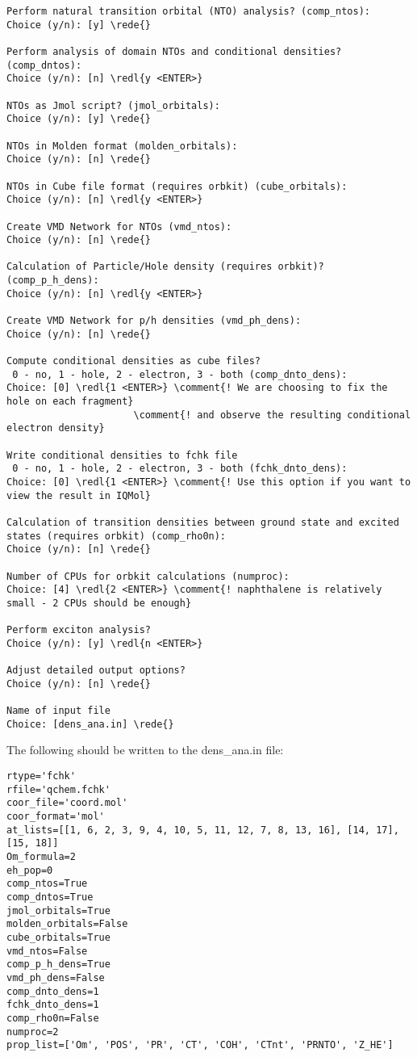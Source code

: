 \documentclass[DIV=12,headings=normal]{scrartcl}
\newcommand{\comment}[1]{\textcolor{blue}{#1}}
\newcommand{\redl}[1]{{\textcolor{red}{\underline{#1}}}}
\newcommand{\rede}[1]{\redl{#1 <ENTER>}}
\begin{document}
\begin{Verbatim}[commandchars=\\\{\}]
Perform natural transition orbital (NTO) analysis? (comp_ntos):
Choice (y/n): [y] \rede{}

Perform analysis of domain NTOs and conditional densities? (comp_dntos):
Choice (y/n): [n] \redl{y <ENTER>}

NTOs as Jmol script? (jmol_orbitals):
Choice (y/n): [y] \rede{}

NTOs in Molden format (molden_orbitals):
Choice (y/n): [n] \rede{}

NTOs in Cube file format (requires orbkit) (cube_orbitals):
Choice (y/n): [n] \redl{y <ENTER>}

Create VMD Network for NTOs (vmd_ntos):
Choice (y/n): [n] \rede{}

Calculation of Particle/Hole density (requires orbkit)? (comp_p_h_dens):
Choice (y/n): [n] \redl{y <ENTER>}

Create VMD Network for p/h densities (vmd_ph_dens):
Choice (y/n): [n] \rede{}

Compute conditional densities as cube files?
 0 - no, 1 - hole, 2 - electron, 3 - both (comp_dnto_dens):
Choice: [0] \redl{1 <ENTER>} \comment{! We are choosing to fix the hole on each fragment}
                      \comment{! and observe the resulting conditional electron density}

Write conditional densities to fchk file
 0 - no, 1 - hole, 2 - electron, 3 - both (fchk_dnto_dens):
Choice: [0] \redl{1 <ENTER>} \comment{! Use this option if you want to view the result in IQMol}

Calculation of transition densities between ground state and excited states (requires orbkit) (comp_rho0n):
Choice (y/n): [n] \rede{}

Number of CPUs for orbkit calculations (numproc):
Choice: [4] \redl{2 <ENTER>} \comment{! naphthalene is relatively small - 2 CPUs should be enough} 

Perform exciton analysis?
Choice (y/n): [y] \redl{n <ENTER>}

Adjust detailed output options?
Choice (y/n): [n] \rede{}

Name of input file
Choice: [dens_ana.in] \rede{} 
\end{Verbatim}
\normalsize

The following should be written to the dens{\_}ana.in file:
\scriptsize
\begin{Verbatim}[commandchars=\\\{\}]
rtype='fchk'
rfile='qchem.fchk'
coor_file='coord.mol'
coor_format='mol'
at_lists=[[1, 6, 2, 3, 9, 4, 10, 5, 11, 12, 7, 8, 13, 16], [14, 17], [15, 18]]
Om_formula=2
eh_pop=0
comp_ntos=True
comp_dntos=True
jmol_orbitals=True
molden_orbitals=False
cube_orbitals=True
vmd_ntos=False
comp_p_h_dens=True
vmd_ph_dens=False
comp_dnto_dens=1
fchk_dnto_dens=1
comp_rho0n=False
numproc=2
prop_list=['Om', 'POS', 'PR', 'CT', 'COH', 'CTnt', 'PRNTO', 'Z_HE']
\end{Verbatim}
\normalsize
\end{document}
